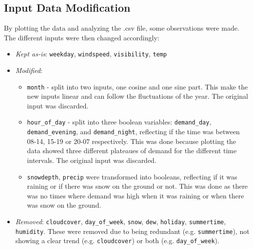 \subsection{Input Data Modification}
By plotting the data and analyzing the .csv file, some observations were made. The different inputs were then changed accordingly:
\begin{itemize}
    \item \emph{Kept as-is}: \texttt{weekday}, \texttt{windspeed}, \texttt{visibility}, \texttt{temp}
    \item \emph{Modified}:
    \begin{itemize}
        \item \texttt{month} - split into two inputs, one cosine and one sine part. This make the new inputs linear and can follow the fluctuations of the year. The original input was discarded.
        \item \texttt{hour\_of\_day} - split into three boolean variables: \texttt{demand\_day}, \texttt{demand\_evening}, and \texttt{demand\_night}, reflecting if the time was between 08-14, 15-19 or 20-07 respectively. This was done because plotting the data showed three different plateaues of demand for the different time intervals. The original input was discarded.
        \item \texttt{snowdepth}, \texttt{precip} were transformed into booleans, reflecting if it was raining or if there was snow on the ground or not. This was done as there was no times where demand was high when it was raining or when there was snow on the ground.
    \end{itemize} 
    \item \emph{Removed}: \texttt{cloudcover}, \texttt{day\_of\_week}, \texttt{snow}, \texttt{dew}, \texttt{holiday}, \texttt{summertime}, \texttt{humidity}. These were removed due to being redundant (e.g. \texttt{summertime}), not showing a clear trend (e.g. \texttt{cloudcover}) or both (e.g. \texttt{day\_of\_week}).
\end{itemize}
